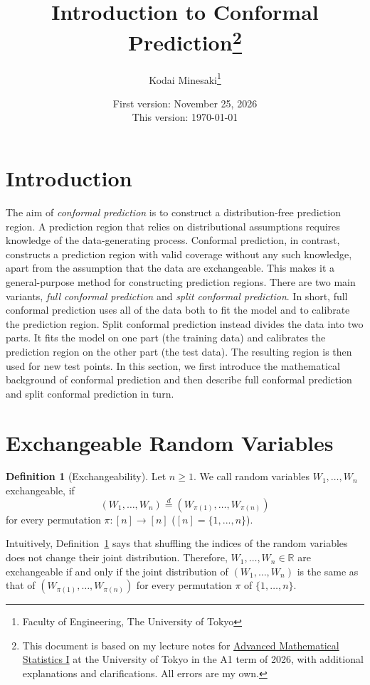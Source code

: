 \documentclass[a4paper,12pt]{article}
\title{Introduction to Conformal Prediction\thanks{This document is based on my lecture notes for \href{https://catalog.he.u-tokyo.ac.jp/detail?code=0704162-01&year=2026}{Advanced
Mathematical Statistics I} at the University of Tokyo in the A1 term of 2026, with additional explanations and clarifications. All errors are my own.}}
\author{Kodai Minesaki\thanks{Faculty of Engineering, The University of Tokyo}}
\date{
    First version: November 25, 2026\\
    This version: \today
}
\numberwithin{equation}{section}
\theoremstyle{plain}
\theoremstyle{definition}
\newtheorem{definition}[theorem]{Definition}
\theoremstyle{remark}
\begin{document}
\maketitle

\section*{Introduction}

The aim of \emph{conformal prediction} is to construct a distribution-free prediction region. A prediction region that relies on distributional assumptions requires knowledge of the data-generating process. Conformal prediction, in contrast, constructs a prediction region with valid coverage without any such knowledge, apart from the assumption that the data are exchangeable. This makes it a general-purpose method for constructing prediction regions. There are two main variants, \emph{full conformal prediction} and \emph{split conformal prediction}. In short, full conformal prediction uses all of the data both to fit the model and to calibrate the prediction region. Split conformal prediction instead divides the data into two parts. It fits the model on one part (the training data) and calibrates the prediction region on the other part (the test data). The resulting region is then used for new test points. In this section, we first introduce the mathematical background of conformal prediction and then describe full conformal prediction and split conformal prediction in turn.

\section{Exchangeable Random Variables}
\begin{definition}[Exchangeability]
\label{definition:ch8-01}
    Let $n\geq 1$. We call random variables $W_1,\dots,W_n$ exchangeable, if 
    \begin{equation}
        (W_1,\dots,W_n)\overset{d}{=}(W_{\pi(1)},\dots,W_{\pi(n)})
        \label{eq:ch8-001}
    \end{equation} 
    for every permutation $\pi:[n]\to[n]$ ($[n]=\{1,...,n\}$).
\end{definition}

Intuitively, Definition~\ref{definition:ch8-01} says that shuffling the indices of the random variables does not change their joint distribution. Therefore, $W_1,\dots,W_n\in\mathbb{R}$ are exchangeable if and only if the joint distribution of $(W_1,\dots,W_n)$ is the same as that of $(W_{\pi(1)},\dots,W_{\pi(n)})$ for every permutation $\pi$ of $\{1,\dots,n\}$.
\end{document}

